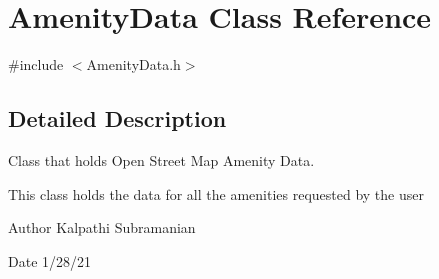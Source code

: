 \hypertarget{class_amenity_data}{}\section{Amenity\+Data Class Reference}
\label{class_amenity_data}


{\ttfamily \#include $<$Amenity\+Data.\+h$>$}



\subsection{Detailed Description}
Class that holds Open Street Map Amenity Data. 

This class holds the data for all the amenities requested by the user

\begin{DoxyAuthor}{Author}
Kalpathi Subramanian
\end{DoxyAuthor}
\begin{DoxyDate}{Date}
1/28/21 
\end{DoxyDate}
